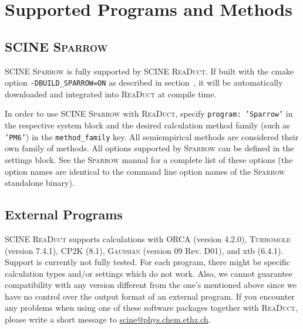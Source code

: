 \documentclass[]{tufte-book}
\begin{document}
\section{Supported Programs and Methods}

\subsection{SCINE \textsc{Sparrow}}

SCINE \textsc{Sparrow} is fully supported by SCINE \textsc{ReaDuct}. If built with the cmake option \texttt{-DBUILD\_SPARROW=ON}
as described in section~, it will be automatically downloaded and integrated into \textsc{ReaDuct}
at compile time.

In order to use SCINE \textsc{Sparrow} with \textsc{ReaDuct}, specify \texttt{program: 'Sparrow'} in the respective system
block and the desired calculation method family (such as \texttt{'PM6'}) in the \texttt{method\_family} key.
All semiempirical methods are considered their own family of methods.
All options supported by \textsc{Sparrow} can be defined in the settings block. See the \textsc{Sparrow} manual for a complete
list of these options (the option names are identical to the command line option names of the \textsc{Sparrow} standalone binary).

\subsection{External Programs}

SCINE \textsc{ReaDuct} supports calculations with \textsc{ORCA}\cite{orca} (version 4.2.0), \textsc{Turbomole}\cite{turbomole} (version 7.4.1), \textsc{CP2K} (8.1)\cite{cp2k}, \textsc{Gaussian}\cite{gaussian09} (version 09 Rev. D01), and xtb (6.4.1)\cite{xtb}. Support is currently not fully tested. For each program, there might be specific calculation types and/or settings which do not work. Also, we cannot guarantee compatibility with any  version different from the one's mentioned above since we have no control over the output format of an external program. If you encounter any problems when
using one of these software packages together with \textsc{ReaDuct}, please write a short message to \href{scine@phys.chem.ethz.ch}{scine@phys.chem.ethz.ch}.
\end{document}
